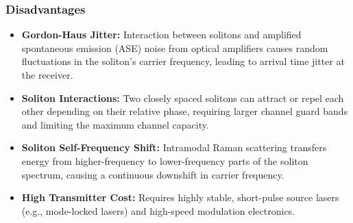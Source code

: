 \subsubsection{Disadvantages}
\begin{itemize}
  \item   \textbf{Gordon-Haus Jitter:} Interaction between solitons and amplified spontaneous emission (ASE) noise from optical amplifiers causes random fluctuations in the soliton's carrier frequency, leading to arrival time jitter at the receiver.
  \item   \textbf{Soliton Interactions:} Two closely spaced solitons can attract or repel each other depending on their relative phase, requiring larger channel guard bands and limiting the maximum channel capacity.
  \item   \textbf{Soliton Self-Frequency Shift:} Intramodal Raman scattering transfers energy from higher-frequency to lower-frequency parts of the soliton spectrum, causing a continuous downshift in carrier frequency.
  \item   \textbf{High Transmitter Cost:} Requires highly stable, short-pulse source lasers (e.g., mode-locked lasers) and high-speed modulation electronics.
\end{itemize}
